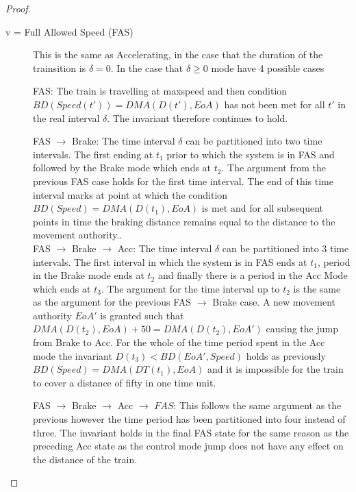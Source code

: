 \begin{mytheorem}
\begin{proof}
\begin{description}
\item[v = Full Allowed Speed (FAS)]
This is the same as  Accelerating, in the case that the duration of the trainsition is $\delta = 0 $. In the case that $\delta \geq 0$ mode have 4 possible cases 

FAS: The train is travelling at maxspeed and then condition $BD(Speed(t')) = DMA(D(t'), EoA)$ has not been met for all $t'$ in the real interval $\delta$. The invariant therefore continues to hold.

FAS $\to$ Brake: The time interval $\delta$ can be partitioned into two time intervals. The first ending at $t_1$ prior to which the system is in FAS and followed by the Brake mode which ends at $t_2$. The argument from the previous FAS case holds for the first time interval. The end of this time interval marks at point at which the condition $BD(Speed) = DMA(D(t_1), EoA)$ is met and for all subsequent points in time  the braking distance remains equal to the distance to the movement authority.. \\

FAS $\to$ Brake $\to$ Acc: The time interval $\delta$ can be partitioned into 3 time intervals. The first interval in which the system is in FAS ends at $t_1$, period in the Brake mode ends at $t_2$ and finally there is a period in the Acc Mode which ends at $t_3$. The argument for the time interval up to $t_2$ is the same as the argument for the previous FAS $\to$ Brake case. A new movement authority $EoA'$ is granted such that $ DMA(D(t_2), EoA) + 50 =  DMA(D(t_2), EoA')$ causing the jump from Brake to  Acc.  For the whole of the  time period spent in the Acc mode the invariant $D(t_3) < BD(EoA',Speed)$ holds as previously $BD(Speed) = DMA(DT(t_1), EoA)$ and it is impossible for the train to cover a distance of fifty in one time unit.


FAS $\to$ Brake $\to$ Acc $\to$ $FAS$: This follows the same argument as the previous however the time period has been partitioned into four instead of three. The invariant holds in the final FAS state for the same reason as the preceding Acc state as the control mode jump does not have any effect on the distance of the train.

\end{description}
\end{proof}
\end{mytheorem}

